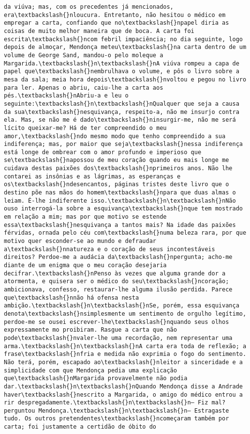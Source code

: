 \begin{Verbatim}[commandchars=\\\{\}]
da viúva; mas, com os precedentes já mencionados, era\textbackslash{}nloucura. Entretanto, não hesitou o médico em empregar a carta, confiando que no\textbackslash{}npapel diria as coisas de muito melhor maneira que de boca. A carta foi escrita\textbackslash{}ncom febril impaciência; no dia seguinte, logo depois de almoçar, Mendonça meteu\textbackslash{}na carta dentro de um volume de George Sand, mandou-o pelo moleque a Margarida.\textbackslash{}n\textbackslash{}nA viúva rompeu a capa de papel que\textbackslash{}nembrulhava o volume, e pôs o livro sobre a mesa da sala; meia hora depois\textbackslash{}nvoltou e pegou no livro para ler. Apenas o abriu, caiu-lhe a carta aos pés.\textbackslash{}nAbriu-a e leu o seguinte:\textbackslash{}n\textbackslash{}nQualquer que seja a causa da sua\textbackslash{}nesquivança, respeito-a, não me insurjo contra ela. Mas, se não me é dado\textbackslash{}ninsurgir-me, não me será lícito queixar-me? Há de ter compreendido o meu amor,\textbackslash{}ndo mesmo modo que tenho compreendido a sua indiferença; mas, por maior que seja\textbackslash{}nessa indiferença está longe de ombrear com o amor profundo e imperioso que se\textbackslash{}napossou de meu coração quando eu mais longe me cuidava destas paixões dos\textbackslash{}nprimeiros anos. Não lhe contarei as insônias e as lágrimas, as esperanças e os\textbackslash{}ndesencantos, páginas tristes deste livro que o destino põe nas mãos do homem\textbackslash{}npara que duas almas o leiam. É-lhe indiferente isso.\textbackslash{}n\textbackslash{}nNão ouso interrogá-la sobre a esquivança\textbackslash{}nque tem mostrado em relação a mim; mas por que motivo se estende essa\textbackslash{}nesquivança a tantos mais? Na idade das paixões férvidas, ornada pelo céu com\textbackslash{}numa beleza rara, por que motivo quer esconder-se ao mundo e defraudar a\textbackslash{}nnatureza e o coração de seus incontestáveis direitos? Perdoe-me a audácia da\textbackslash{}npergunta; acho-me diante de um enigma que o meu coração desejaria decifrar.\textbackslash{}nPenso às vezes que alguma grande dor a atormenta, e quisera ser o médico do seu\textbackslash{}ncoração; ambicionava, confesso, restaurar-lhe alguma ilusão perdida. Parece que\textbackslash{}nnão há ofensa nesta ambição.\textbackslash{}n\textbackslash{}nSe, porém, essa esquivança denota\textbackslash{}nsimplesmente um sentimento de orgulho legítimo, perdoe-me se ousei escrever-lhe\textbackslash{}nquando seus olhos expressamente mo proibiram. Rasgue a carta que não pode\textbackslash{}nvaler-lhe uma recordação, nem representar uma arma.\textbackslash{}n\textbackslash{}nA carta era toda de reflexão; a frase\textbackslash{}nfria e medida não exprimia o fogo do sentimento. Não terá, porém, escapado ao\textbackslash{}nleitor a sinceridade e a simplicidade com que Mendonça pedia uma explicação que\textbackslash{}nMargarida provavelmente não podia dar.\textbackslash{}n\textbackslash{}nQuando Mendonça disse a Andrade haver\textbackslash{}nescrito a Margarida, o amigo do médico entrou a rir despregadamente.\textbackslash{}n\textbackslash{}n— Fiz mal? perguntou Mendonça.\textbackslash{}n\textbackslash{}n— Estragaste tudo. Os outros pretendentes\textbackslash{}ncomeçaram também por carta; foi justamente a certidão de óbito do 
\end{Verbatim}
